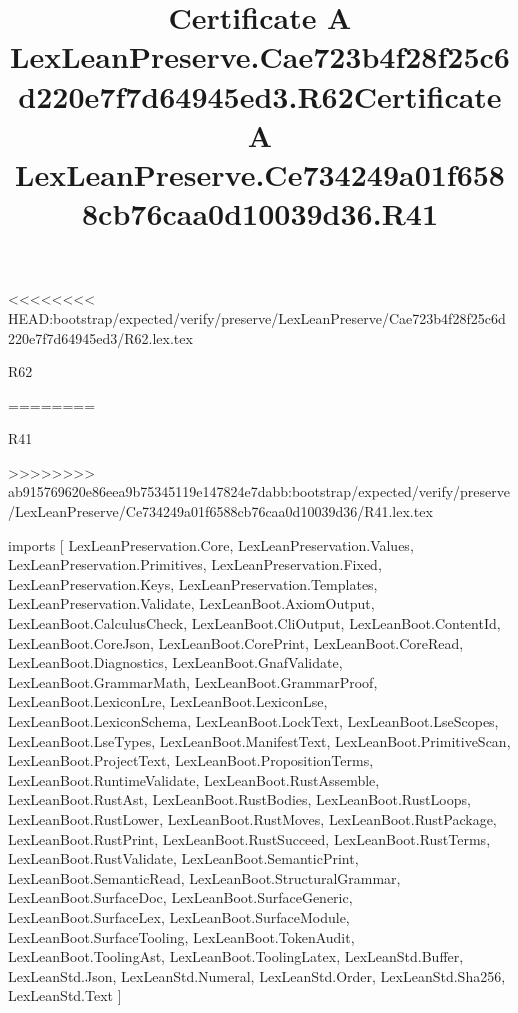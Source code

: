<<<<<<<< HEAD:bootstrap/expected/verify/preserve/LexLeanPreserve/Cae723b4f28f25c6d220e7f7d64945ed3/R62.lex.tex
\begin{lexlean}{R62}
\title{Certificate A LexLeanPreserve.Cae723b4f28f25c6d220e7f7d64945ed3.R62}
========
\begin{lexlean}{R41}
\title{Certificate A LexLeanPreserve.Ce734249a01f6588cb76caa0d10039d36.R41}
>>>>>>>> ab915769620e86eea9b75345119e147824e7dabb:bootstrap/expected/verify/preserve/LexLeanPreserve/Ce734249a01f6588cb76caa0d10039d36/R41.lex.tex
\begin{coremodule}
imports [
  LexLeanPreservation.Core,
  LexLeanPreservation.Values,
  LexLeanPreservation.Primitives,
  LexLeanPreservation.Fixed,
  LexLeanPreservation.Keys,
  LexLeanPreservation.Templates,
  LexLeanPreservation.Validate,
  LexLeanBoot.AxiomOutput,
  LexLeanBoot.CalculusCheck,
  LexLeanBoot.CliOutput,
  LexLeanBoot.ContentId,
  LexLeanBoot.CoreJson,
  LexLeanBoot.CorePrint,
  LexLeanBoot.CoreRead,
  LexLeanBoot.Diagnostics,
  LexLeanBoot.GnafValidate,
  LexLeanBoot.GrammarMath,
  LexLeanBoot.GrammarProof,
  LexLeanBoot.LexiconLre,
  LexLeanBoot.LexiconLse,
  LexLeanBoot.LexiconSchema,
  LexLeanBoot.LockText,
  LexLeanBoot.LseScopes,
  LexLeanBoot.LseTypes,
  LexLeanBoot.ManifestText,
  LexLeanBoot.PrimitiveScan,
  LexLeanBoot.ProjectText,
  LexLeanBoot.PropositionTerms,
  LexLeanBoot.RuntimeValidate,
  LexLeanBoot.RustAssemble,
  LexLeanBoot.RustAst,
  LexLeanBoot.RustBodies,
  LexLeanBoot.RustLoops,
  LexLeanBoot.RustLower,
  LexLeanBoot.RustMoves,
  LexLeanBoot.RustPackage,
  LexLeanBoot.RustPrint,
  LexLeanBoot.RustSucceed,
  LexLeanBoot.RustTerms,
  LexLeanBoot.RustValidate,
  LexLeanBoot.SemanticPrint,
  LexLeanBoot.SemanticRead,
  LexLeanBoot.StructuralGrammar,
  LexLeanBoot.SurfaceDoc,
  LexLeanBoot.SurfaceGeneric,
  LexLeanBoot.SurfaceLex,
  LexLeanBoot.SurfaceModule,
  LexLeanBoot.SurfaceTooling,
  LexLeanBoot.TokenAudit,
  LexLeanBoot.ToolingAst,
  LexLeanBoot.ToolingLatex,
  LexLeanStd.Buffer,
  LexLeanStd.Json,
  LexLeanStd.Numeral,
  LexLeanStd.Order,
  LexLeanStd.Sha256,
  LexLeanStd.Text
]


\end{coremodule}
\end{lexlean}
\end{lexlean}
